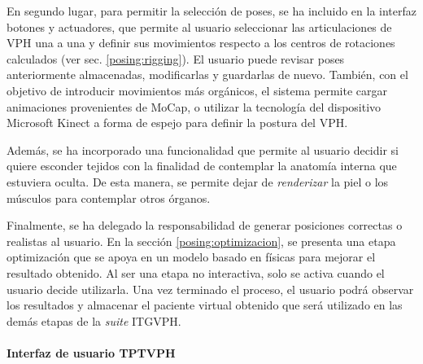 En segundo lugar, para permitir la selección de poses, se ha incluido en la interfaz botones y actuadores, que permite al usuario seleccionar las articulaciones de \ac{VPH} una a una y definir sus movimientos respecto a los centros de rotaciones calculados (ver sec. \ref{posing:rigging}). El usuario puede revisar poses anteriormente almacenadas, modificarlas y guardarlas de nuevo. También, con el objetivo de introducir movimientos más orgánicos, el sistema permite cargar animaciones provenientes de \ac{MoCap}, o utilizar la tecnología del dispositivo Microsoft Kinect a forma de espejo para definir la postura del \ac{VPH}.

Además, se ha incorporado una funcionalidad que permite al usuario decidir si quiere esconder tejidos con la finalidad de contemplar la anatomía interna que estuviera oculta. De esta manera, se permite dejar de \emph{renderizar} la piel o los músculos para contemplar otros órganos.%

Finalmente, se ha delegado la responsabilidad de generar posiciones correctas o realistas al usuario. En la sección \ref{posing:optimizacion}, se presenta una etapa optimización que se apoya en un modelo basado en físicas para mejorar el resultado obtenido. Al ser una etapa no interactiva, solo se activa cuando el usuario decide utilizarla. Una vez terminado el proceso, el usuario podrá observar los resultados y almacenar el paciente virtual obtenido que será utilizado en las demás etapas de la \emph{suite} \ac{ITGVPH}.  


\paragraph{Interfaz de usuario \ac{TPTVPH}}\mbox{}\\

